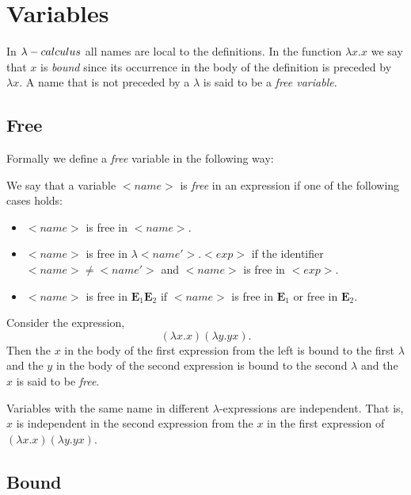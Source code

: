 
\section{Variables} %
\label{sec:variables}

In $\lambda-calculus$ all names are local to the definitions. In the
function $\lambda x.x$ we say that $x$ is \emph{bound}
since its occurrence in the body of the definition is
preceded by $\lambda x$. A name that is not preceded by a
$\lambda$ is said to be a \emph{free variable}.

%
\subsection{Free}

Formally we define a \emph{free} variable in the following
way:

\begin{defn}
	We say that a variable $<name>$ is \emph{free} in an
	expression if one of the following cases holds:
	\begin{itemize}
		\item $<name>$ is free in $<name>$.
		\item $<name>$ is free in $\lambda <name'>.<exp>$
			if the identifier $<name> \neq <name'>$ and
			$<name>$ is free in $<exp>$.
		\item $<name>$ is free in $\textbf{E}_1 \textbf{E}_2$
			if $<name>$ is free in $\textbf{E}_1$ or free in
			$\textbf{E}_2$.
	\end{itemize}
\end{defn}

\begin{exmp}
	Consider the expression,
	\[
		(\lambda x.x)(\lambda y.yx).
	\]
	Then the $x$ in the body of the first expression from the left is
	bound to the first $\lambda$ and the $y$ in the body of the second
	expression is bound to the second $\lambda$ and the $x$ is said to
	be \emph{free}.
\end{exmp}

\begin{rem}
	Variables with the same name in different $\lambda$-expressions are
	independent. That is, $x$ is independent in the second expression
	from the $x$ in the first expression of $(\lambda x.x)(\lambda y.yx)$.
\end{rem}

%
\subsection{Bound}


